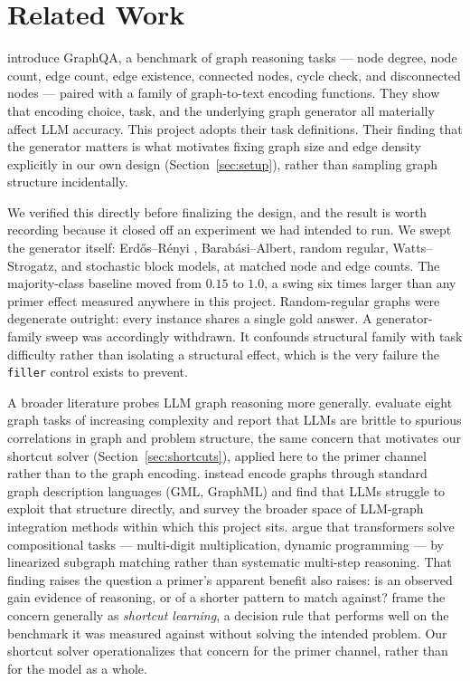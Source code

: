 \documentclass[11pt]{article}
\begin{document}
\section{Related Work}
\label{sec:related-work}

\citet{fatemi2023talklikeagraph} introduce GraphQA, a benchmark of graph
reasoning tasks --- node degree, node count, edge count, edge existence,
connected nodes, cycle check, and disconnected nodes --- paired with a
family of graph-to-text encoding functions. They show that encoding choice,
task, and the underlying graph generator all materially affect LLM
accuracy. This project adopts their task definitions. Their finding that
the generator matters is what motivates fixing graph size and edge density
explicitly in our own design (Section~\ref{sec:setup}), rather than
sampling graph structure incidentally.

We verified this directly before finalizing the design, and the result is
worth recording because it closed off an experiment we had intended to run.
We swept the generator itself: Erd\H{o}s--R\'enyi
\citep{erdosrenyi1959random}, Barab\'asi--Albert, random regular,
Watts--Strogatz, and stochastic block models, at matched node and edge
counts. The majority-class baseline moved from $0.15$ to $1.0$, a swing six
times larger than any primer effect measured anywhere in this project.
Random-regular graphs were degenerate outright: every instance shares a
single gold answer. A generator-family sweep was accordingly withdrawn. It
confounds structural family with task difficulty rather than isolating a
structural effect, which is the very failure the \texttt{filler} control
exists to prevent.

A broader literature probes LLM graph reasoning more generally.
\citet{wang2023nlgraph} evaluate eight graph tasks of increasing
complexity and report that LLMs are brittle to spurious correlations in
graph and problem structure, the same concern that motivates our shortcut
solver (Section~\ref{sec:shortcuts}), applied here to the primer channel
rather than to the graph encoding. \citet{guo2023gpt4graph} instead encode
graphs through standard graph description languages (GML, GraphML) and
find that LLMs struggle to exploit that structure directly, and
\citet{jin2024largelanguagemodelsongraphs} survey the broader space of
LLM-graph integration methods within which this project sits.
\citet{dziri2023faithandfate} argue that transformers solve compositional
tasks --- multi-digit multiplication, dynamic programming --- by
linearized subgraph matching rather than systematic multi-step reasoning.
That finding raises the question a primer's apparent benefit also raises:
is an observed gain evidence of reasoning, or of a shorter pattern to match
against? \citet{geirhos2020shortcut} frame the concern generally as
\emph{shortcut learning}, a decision rule that performs well on the
benchmark it was measured against without solving the intended problem. Our
shortcut solver operationalizes that concern for the primer channel, rather
than for the model as a whole.
\end{document}
